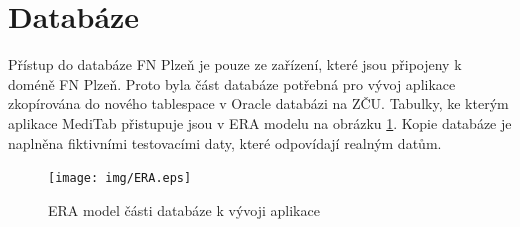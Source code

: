 \section{Databáze}

Přístup do databáze FN Plzeň je pouze ze zařízení, které jsou připojeny k doméně FN Plzeň. Proto byla část databáze potřebná pro vývoj aplikace zkopírována do nového tablespace v Oracle databázi na ZČU. Tabulky, ke kterým aplikace MediTab přistupuje jsou v ERA modelu na obrázku \ref{fig:era}. Kopie databáze je naplněna fiktivními testovacími daty, které odpovídají realným datům.

\begin{figure}[H]
	\centering
	\texttt{[image: img/ERA.eps]}
	\caption{ERA model části databáze k vývoji aplikace}
  \label{fig:era}
\end{figure}
